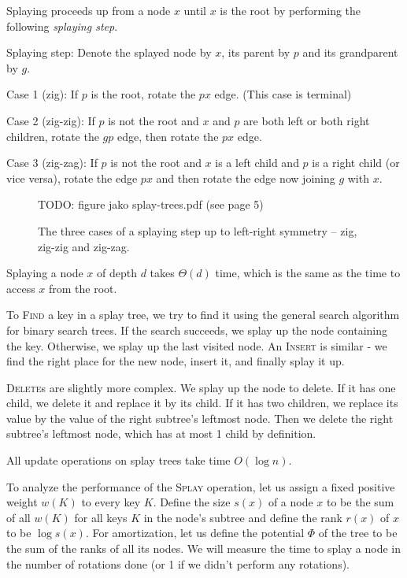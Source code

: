 Splaying proceeds up from a node $x$ until $x$ is the root by performing
the following \textit{splaying step}.

Splaying step:
Denote the splayed node by $x$, its parent by $p$ and its grandparent by $g$.

Case 1 (zig): If $p$ is the root, rotate the $px$ edge. (This case is terminal)

Case 2 (zig-zig): If $p$ is not the root and $x$ and
		$p$ are both left or both right children, rotate
		the $gp$ edge, then rotate the $px$ edge.

Case 3 (zig-zag): If $p$ is not the root and $x$ is a left child and $p$
		is a right child (or vice versa), rotate the edge $px$ and
		then rotate the edge now joining $g$ with $x$.

\begin{figure}
\centering
TODO: figure jako splay-trees.pdf (see page 5)
\caption{The three cases of a splaying step up to left-right symmetry --
	zig, zig-zig and zig-zag.}
\end{figure}

Splaying a node $x$ of depth $d$ takes $\Theta(d)$ time, which is the same
as the time to access $x$ from the root.

To \textsc{Find} a key in a splay tree, we try to find it using the general
search algorithm for binary search trees. If the search succeeds, we splay
up the node containing the key. Otherwise, we splay up the last visited
node.
An \textsc{Insert} is similar - we find the right place for the new node,
insert it, and finally splay it up.

\textsc{Delete}s are slightly more complex. We splay up the node to delete.
If it has one child, we delete it and replace it by its child. If it has
two children, we replace its value by the value of the right subtree's
leftmost node. Then we delete the right subtree's leftmost node, which has at
most 1 child by definition.

All update operations on splay trees take time $O(\log n)$.

To analyze the performance of the \textsc{Splay} operation, let us assign
a fixed positive weight $w(K)$ to every key $K$. Define the size $s(x)$
of a node $x$ to be the sum of all $w(K)$ for all keys $K$ in the node's
subtree and define the rank $r(x)$ of $x$ to be $\log s(x)$.
For amortization, let us define the potential $\Phi$ of the tree to be
the sum of the ranks of all its nodes.
We will measure the time to splay a node in the number of rotations done
(or 1 if we didn't perform any rotations).

